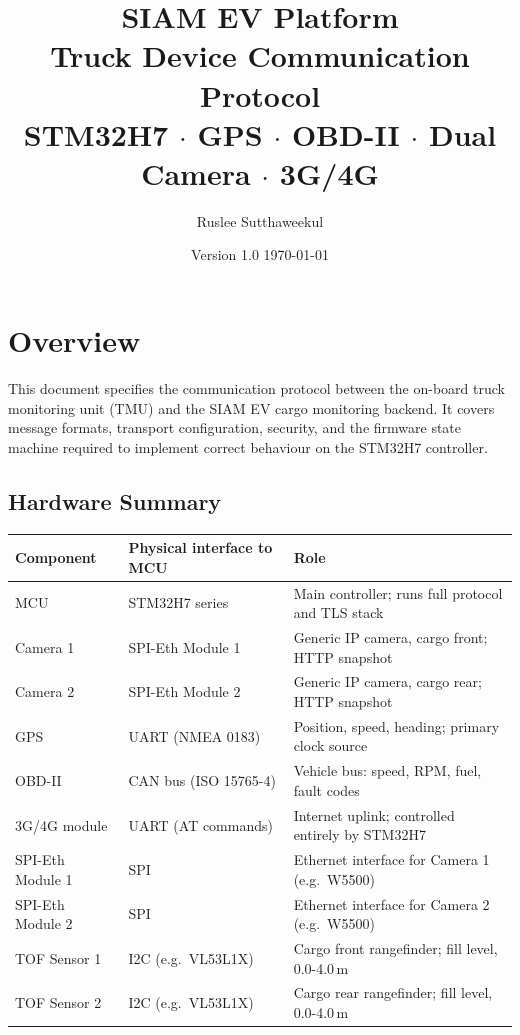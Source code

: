 \documentclass{article}
\title{%
    \textbf{SIAM EV Platform}\\[6pt]
    \large Truck Device Communication Protocol\\[4pt]
    \normalsize STM32H7 $\cdot$ GPS $\cdot$ OBD-II $\cdot$ Dual Camera $\cdot$ 3G/4G
}
\author{Ruslee Sutthaweekul}
\date{Version 1.0 \quad\textbullet\quad \today}
\begin{document}
\maketitle
\tableofcontents
\newpage

\section{Overview}

This document specifies the communication protocol between the on-board truck
monitoring unit (TMU) and the SIAM EV cargo monitoring backend. It covers
message formats, transport configuration, security, and the firmware state
machine required to implement correct behaviour on the STM32H7 controller.

\subsection{Hardware Summary}

\begin{center}
\begin{tabular}{lll}
\toprule
\textbf{Component} & \textbf{Physical interface to MCU} & \textbf{Role}\\
\midrule
MCU              & STM32H7 series        & Main controller; runs full protocol and TLS stack\\
Camera 1         & SPI-Eth Module 1      & Generic IP camera, cargo front; HTTP snapshot\\
Camera 2         & SPI-Eth Module 2      & Generic IP camera, cargo rear; HTTP snapshot\\
GPS              & UART (NMEA 0183)      & Position, speed, heading; primary clock source\\
OBD-II           & CAN bus (ISO 15765-4) & Vehicle bus: speed, RPM, fuel, fault codes\\
3G/4G module     & UART (AT commands)    & Internet uplink; controlled entirely by STM32H7\\
SPI-Eth Module 1 & SPI                   & Ethernet interface for Camera 1 (e.g.\ W5500)\\
SPI-Eth Module 2 & SPI                   & Ethernet interface for Camera 2 (e.g.\ W5500)\\
TOF Sensor 1     & I2C (e.g.\ VL53L1X)   & Cargo front rangefinder; fill level, 0.0-4.0\,m\\
TOF Sensor 2     & I2C (e.g.\ VL53L1X)   & Cargo rear rangefinder; fill level, 0.0-4.0\,m\\
\bottomrule
\end{tabular}
\end{center}
\end{document}
